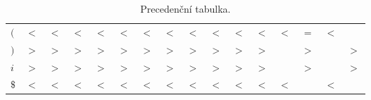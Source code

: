 \documentclass[a4paper, 12pt]{article}
\begin{document}
\begin{table}[h]
\begin{tabular}[p]{| l | c | c | c | c | c | c | c | c | c | c | c | c | c | c | c |}
            \textbf{$($} &
                $<$ & $<$ & $<$ & $<$ & $<$ & $<$ & $<$ & $<$ & $<$ & $<$ & $<$ & $<$ & $=$ & $<$ &     \\
            \textbf{$)$} &
                $>$ & $>$ & $>$ & $>$ & $>$ & $>$ & $>$ & $>$ & $>$ & $>$ & $>$ &     & $>$ &     & $>$ \\
            \textbf{$i$} &
                $>$ & $>$ & $>$ & $>$ & $>$ & $>$ & $>$ & $>$ & $>$ & $>$ & $>$ &     & $>$ &     & $>$ \\
            \textbf{$\$$} &
                $<$ & $<$ & $<$ & $<$ & $<$ & $<$ & $<$ & $<$ & $<$ & $<$ & $<$ & $<$ &     & $<$ &     \\
            \hline
        \end{tabular}
        \caption{Precedenční tabulka.}
        \label{tabulka precedence}
    \end{table}

    \newpage
	\renewcommand{\refname}{Zdroje}
	\printbibliography
\end{document}
